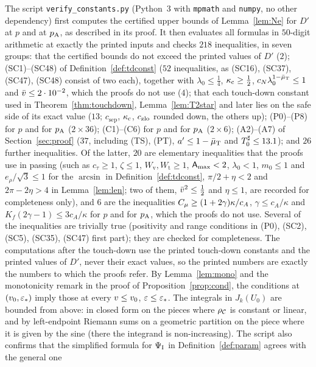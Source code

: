 The script \texttt{verify\_constants.py} (Python~3 with \texttt{mpmath} and \texttt{numpy}, no other dependency) first computes the
certified upper bounds of Lemma~\ref{lem:Ne} for $D'$ at $p$ and at $p_{\mathrm A}$, as described in its proof. It then evaluates all formulas in
$50$-digit arithmetic at exactly the printed inputs and checks $218$ inequalities, in seven groups: that the certified bounds do not exceed
the printed values of $D'$ ($2$); (SC1)--(SC48) of Definition~\ref{def:tdconst} ($52$ inequalities, as (SC16), (SC37), (SC47), (SC48)
consist of two each), together with $\lambda_0\le\frac14$, $\kappa_{\mathrm c}\ge\frac12$, $c_N\lambda_0^{1-\bar\mu_{\mathrm T}}\le1$ and $\bar v\le2\cdot10^{-2}$, which
the proofs do not use ($4$); that each touch-down constant used in Theorem~\ref{thm:touchdown}, Lemma~\ref{lem:T2star} and later lies on
the safe side of its exact value ($13$; $c_{\mathrm{sep}}$, $\kappa_{\mathrm c}$, $c_{\mathrm{zlo}}$ rounded down, the others up); (P0)--(P8) for $p$ and for $p_{\mathrm A}$
($2\times36$); (C1)--(C6) for $p$ and for $p_{\mathrm A}$ ($2\times6$); (A2)--(A7) of Section~\ref{sec:proof} ($37$, including (TS), (PT),
$a'\le1-\bar\mu_{\mathrm T}$ and $T_0^\sharp\le13.1$); and $26$ further inequalities. Of the latter, $20$ are elementary inequalities that the proofs use in
passing (such as $c_\tau\ge1$, $\zeta\le1$, $W_{\mathrm v},W_{\mathrm t}\ge1$, $\mathsf A_{\max}<2$, $\lambda_0<1$, $m_0\le1$ and $e_\rho/\sqrt3\le1$
for the $\arcsin$ in Definition~\ref{def:tdconst}, $\pi/2+\eta<2$ and $2\pi-2\eta>4$ in Lemma~\ref{lem:len}; two of them, $\bar v^2\le\frac12$ and $\eta\le1$, are recorded for completeness only), and $6$ are the inequalities
$C_\mu\ge(1+2\gamma)\kappa/c_A$, $\gamma\le c_A/\kappa$ and $K_f(2\gamma-1)\le3c_A/\kappa$ for $p$ and for $p_{\mathrm A}$, which the proofs do not use.
Several of the inequalities are trivially true (positivity and range conditions in (P0), (SC2), (SC5), (SC35), (SC47) first part); they are
checked for completeness. The computations after the touch-down use the printed touch-down constants and the printed values of $D'$,
never their exact values, so the printed numbers are exactly the numbers to which the proofs refer. By Lemma~\ref{lem:mono} and the
monotonicity remark in the proof of Proposition~\ref{prop:cond}, the conditions at $(v_0,\varepsilon_*)$ imply those at every $v\le v_0$,
$\varepsilon\le\varepsilon_*$. The integrals in $J_k(U_0)$ are bounded from above: in closed form on the pieces where $\rho_{\mathcal C}$ is constant or
linear, and by left-endpoint Riemann sums on a geometric partition on the piece where it is given by the sine (there the integrand is
non-increasing). The script also confirms that the simplified formula for $\Psi_{\mathrm I}$ in Definition~\ref{def:param} agrees with the general one
